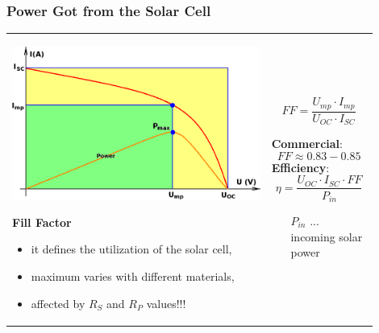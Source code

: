 \documentclass{beamer}
\begin{document}
	\begin{frame}
    \frametitle{Power Got from the Solar Cell}
		\small
		\begin{tabular}{m{0.65\linewidth} m{0.25\linewidth}}
		\includegraphics[scale=0.32]{obr08_plneni.png}
		\begin{flushleft}
			\textbf{Fill Factor}
		\end{flushleft}
		\small
		\begin{itemize}
			\item it defines the utilization of the solar cell,
			\item maximum varies with different materials,
			\item affected by $R_S$ and $R_P$ values!!!
		\end{itemize}
		& $$FF=\frac{U_{mp}\cdot I_{mp}}{U_{OC}\cdot I_{SC}}$$
		
		\textbf{Commercial}: $$FF\approx0.83-0.85$$
		\textbf{Efficiency}: $$\eta=\frac{U_{OC}\cdot I_{SC}\cdot FF}{P_{in}}$$
		
		\begin{itemize}
			\item[$P_{in}$]... incoming solar power
		\end{itemize}
		\end{tabular}
		
	\end{frame}
\end{document}
